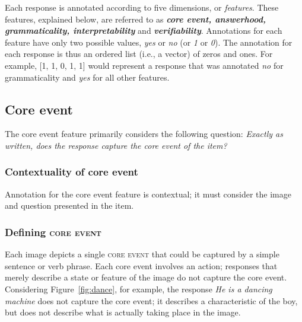 \documentclass[12pt]{article}
\newcommand{\feat}[1]{\textsc{#1}}
\begin{document}
Each response is annotated according to five dimensions, or \textit{features}. These features, explained below, are referred to as \textit{\textbf{core event, answerhood, grammaticality, interpretability}} and \textit{\textbf{verifiability}}. Annotations for each feature have only two possible values, \textit{yes} or \textit{no} (or \textit{1} or \textit{0}). The annotation for each response is thus an ordered list (i.e., a vector) of zeros and ones. For example, [1, 1, 0, 1, 1] would represent a response that was annotated \textit{no} for grammaticality and \textit{yes} for all other features.


\subsection{Core event} \label{subsec:core-event}
The core event feature primarily considers the following question: \textit{Exactly as written, does the response capture the core event of the item?}

\subsubsection{Contextuality of core event} Annotation for the core event feature is contextual; it must consider the image and question presented in the item. 

\subsubsection{Defining \feat{core event}}
Each image depicts a single \feat{core event} that could be captured by a simple sentence or verb phrase. Each core event involves an action; responses that merely describe a state or feature of the image do not capture the core event. Considering Figure~\ref{fig:dance}, for example, the response \textit{He is a dancing machine} does not capture the core event; it describes a characteristic of the boy, but does not describe what is actually taking place in the image.
\end{document}
